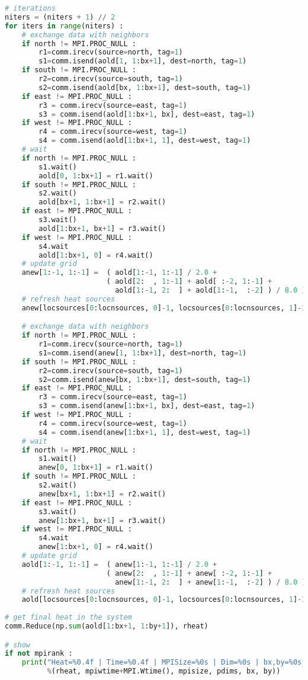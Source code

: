 \begin{lstlisting}[language=Python, caption={Parallel Python implementation of the stencil test case.}]
# iterations
niters = (niters + 1) // 2
for iters in range(niters) :
    # exchange data with neighbors
    if north != MPI.PROC_NULL :
        r1=comm.irecv(source=north, tag=1)
        s1=comm.isend(aold[1, 1:bx+1], dest=north, tag=1)
    if south != MPI.PROC_NULL :
        r2=comm.irecv(source=south, tag=1)
        s2=comm.isend(aold[bx, 1:bx+1], dest=south, tag=1)
    if east != MPI.PROC_NULL :
        r3 = comm.irecv(source=east, tag=1)
        s3 = comm.isend(aold[1:bx+1, bx], dest=east, tag=1)
    if west != MPI.PROC_NULL :
        r4 = comm.irecv(source=west, tag=1)
        s4 = comm.isend(aold[1:bx+1, 1], dest=west, tag=1)
    # wait
    if north != MPI.PROC_NULL :
        s1.wait()
        aold[0, 1:bx+1] = r1.wait()
    if south != MPI.PROC_NULL :
        s2.wait()
        aold[bx+1, 1:bx+1] = r2.wait()
    if east != MPI.PROC_NULL :
        s3.wait()
        aold[1:bx+1, bx+1] = r3.wait()
    if west != MPI.PROC_NULL :
        s4.wait
        aold[1:bx+1, 0] = r4.wait()
    # update grid
    anew[1:-1, 1:-1] =  ( aold[1:-1, 1:-1] / 2.0 + 
                        ( aold[2:  , 1:-1] + aold[ :-2, 1:-1] +
                          aold[1:-1, 2:  ] + aold[1:-1,  :-2] ) / 8.0 )
    # refresh heat sources
    anew[locsources[0:locnsources, 0]-1, locsources[0:locnsources, 1]-1] += energy 

    # exchange data with neighbors
    if north != MPI.PROC_NULL :
        r1=comm.irecv(source=north, tag=1)
        s1=comm.isend(anew[1, 1:bx+1], dest=north, tag=1)
    if south != MPI.PROC_NULL :
        r2=comm.irecv(source=south, tag=1)
        s2=comm.isend(anew[bx, 1:bx+1], dest=south, tag=1)
    if east != MPI.PROC_NULL :
        r3 = comm.irecv(source=east, tag=1)
        s3 = comm.isend(anew[1:bx+1, bx], dest=east, tag=1)
    if west != MPI.PROC_NULL :
        r4 = comm.irecv(source=west, tag=1)
        s4 = comm.isend(anew[1:bx+1, 1], dest=west, tag=1)
    # wait
    if north != MPI.PROC_NULL :
        s1.wait()
        anew[0, 1:bx+1] = r1.wait()
    if south != MPI.PROC_NULL :
        s2.wait()
        anew[bx+1, 1:bx+1] = r2.wait()
    if east != MPI.PROC_NULL :
        s3.wait()
        anew[1:bx+1, bx+1] = r3.wait()
    if west != MPI.PROC_NULL :
        s4.wait
        anew[1:bx+1, 0] = r4.wait()
    # update grid
    aold[1:-1, 1:-1] =  ( anew[1:-1, 1:-1] / 2.0 + 
                        ( anew[2:  , 1:-1] + anew[ :-2, 1:-1] +
                          anew[1:-1, 2:  ] + anew[1:-1,  :-2] ) / 8.0 )
    # refresh heat sources
    aold[locsources[0:locnsources, 0]-1, locsources[0:locnsources, 1]-1] += energy 
    
# get final heat in the system
comm.Reduce(np.sum(aold[1:bx+1, 1:by+1]), rheat)

# show  
if not mpirank :
    print("Heat=%0.4f | Time=%0.4f | MPISize=%0s | Dim=%0s | bx,by=%0s,%0s" 
          %(rheat, mpiwtime+MPI.Wtime(), mpisize, pdims, bx, by))
\end{lstlisting}




